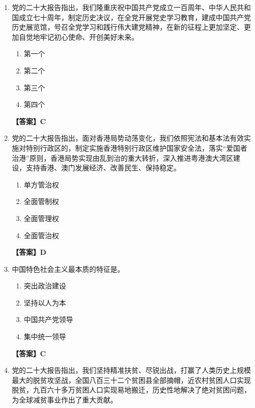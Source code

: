 \documentclass[UTF8,11pt,a4paper]{ctexart}
\begin{document}
\begin{enumerate}[label=\textbf{\arabic*.}, leftmargin=2.5em, itemsep=0.7em]
\begin{enumerate}[label=\Alph*., leftmargin=2em, itemsep=0.1em, topsep=0.15em]
\item ①②③
\item ①②④
\item ①③④
\item ②③④
\end{enumerate}
\textbf{【答案】B}
\item 党的二十大报告指出，我们隆重庆祝中国共产党成立一百周年、中华人民共和国成立七十周年，制定\allowbreak\underline{\hspace{4em}}历史决议，在全党开展党史学习教育，建成中国共产党历史展览馆，号召全党学习和践行伟大建党精神，在新的征程上更加坚定、更加自觉地牢记初心使命、开创美好未来。
\begin{enumerate}[label=\Alph*., leftmargin=2em, itemsep=0.1em, topsep=0.15em]
\item 第一个
\item 第二个
\item 第三个
\item 第四个
\end{enumerate}
\textbf{【答案】C}
\item 党的二十大报告指出，面对香港局势动荡变化，我们依照宪法和基本法有效实施对特别行政区的\allowbreak\underline{\hspace{4em}}，制定实施香港特别行政区维护国家安全法，落实“爱国者治港”原则，香港局势实现由乱到治的重大转折，深入推进粤港澳大湾区建设，支持香港、澳门发展经济、改善民生、保持稳定。
\begin{enumerate}[label=\Alph*., leftmargin=2em, itemsep=0.1em, topsep=0.15em]
\item 单方管治权
\item 全面管制权
\item 全面管理权
\item 全面管治权
\end{enumerate}
\textbf{【答案】D}
\item 中国特色社会主义最本质的特征是\allowbreak\underline{\hspace{4em}}。
\begin{enumerate}[label=\Alph*., leftmargin=2em, itemsep=0.1em, topsep=0.15em]
\item 突出政治建设
\item 坚持以人为本
\item 中国共产党领导
\item 集中统一领导
\end{enumerate}
\textbf{【答案】C}
\item 党的二十大报告指出，我们坚持精准扶贫、尽锐出战，打赢了人类历史上规模最大的脱贫攻坚战，全国八百三十二个贫困县全部摘帽，近\allowbreak\underline{\hspace{4em}}农村贫困人口实现脱贫，九百六十多万贫困人口实现易地搬迁，历史性地解决了绝对贫困问题，为全球减贫事业作出了重大贡献。

\end{enumerate}
\end{document}
